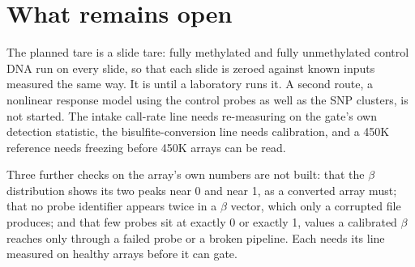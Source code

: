 \section{What remains open}

The planned tare is a slide tare: fully methylated and fully unmethylated control DNA run on every slide, so that each slide is zeroed
against known inputs measured the same way. It is \openprob{} until a laboratory runs it. A second route, a nonlinear response model using the
control probes as well as the SNP clusters, is not started. The intake call-rate line needs re-measuring on the gate's own detection statistic,
the bisulfite-conversion line needs calibration, and a 450K reference needs freezing before 450K arrays can be read. \openprob

Three further checks on the array's own numbers are not built: that the $\beta$ distribution shows its two peaks near 0 and near 1,
as a converted array must; that no probe identifier appears twice in a $\beta$ vector, which only a corrupted file produces; and that
few probes sit at exactly 0 or exactly 1, values a calibrated $\beta$ reaches only through a failed probe or a broken pipeline. Each
needs its line measured on healthy arrays before it can gate. \openprob
